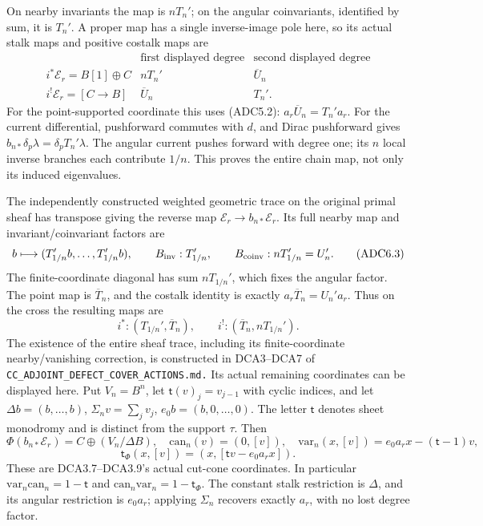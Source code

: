 On nearby invariants the map is \(nT_n'\); on the angular coinvariants,
identified by sum, it is \(T_n'\). A proper map has a single
inverse-image pole here, so its actual stalk maps and positive costalk
maps are \[
\begin{array}{c|cc}
&\text{first displayed degree}&\text{second displayed degree}\\ \hline
i^*\mathscr E_r=B[1]\oplus C&nT_n'&\overline U_n\\
i^!\mathscr E_r=[C\to B]&\overline U_n&T_n'.
\end{array}
\tag{ADC6.2}
\] For the point-supported coordinate this uses (ADC5.2):
\(a_r\overline U_n=T_n'a_r\). For the current differential, pushforward
commutes with \(d\), and Dirac pushforward gives
\(b_{n*}\delta_p\lambda=\delta_pT_n'\lambda\). The angular current
pushes forward with degree one; its \(n\) local inverse branches each
contribute \(1/n\). This proves the entire chain map, not only its
induced eigenvalues.

The independently constructed weighted geometric trace on the original
primal sheaf has transpose giving the reverse map
\(\mathscr E_r\to b_{n*}\mathscr E_r\). Its full nearby map and
invariant/coinvariant factors are \[
b\longmapsto(T_{1/n}'b,\ldots,T_{1/n}'b),\qquad
B_{\rm inv}:T_{1/n}',\qquad B_{\rm coinv}:nT_{1/n}'=U_n'.
\tag{ADC6.3}
\] The finite-coordinate diagonal has sum \(nT_{1/n}'\), which fixes the
angular factor. The point map is \(\overline T_n\), and the costalk
identity is exactly \(a_r\overline T_n=U_n'a_r\). Thus on the cross the
resulting maps are \[
i^*: (T_{1/n}',\overline T_n),\qquad
i^!: (\overline T_n,nT_{1/n}').
\tag{ADC6.4}
\] The existence of the entire sheaf trace, including its
finite-coordinate nearby/vanishing correction, is constructed in
DCA3--DCA7 of \nolinkurl{CC_ADJOINT_DEFECT_COVER_ACTIONS.md.} Its actual
remaining coordinates can be displayed here. Put \(V_n=B^n\), let
\(\mathsf t(v)_j=v_{j-1}\) with cyclic indices, and let
\(\Delta b=(b,\ldots,b)\), \(\Sigma_n v=\sum_jv_j\),
\(e_0b=(b,0,\ldots,0)\). The letter \(\mathsf t\) denotes sheet
monodromy and is distinct from the support \(\tau\). Then \[
\Phi(b_{n*}\mathscr E_r)=C\oplus(V_n/\Delta B),\quad
\mathrm{can}_n(v)=(0,[v]),\quad
\mathrm{var}_n(x,[v])=e_0a_rx-(\mathsf t-1)v,
\] \[
\mathsf t_\Phi(x,[v])=(x,[\mathsf t v-e_0a_rx]).
\tag{ADC6.6}
\] These are DCA3.7--DCA3.9's actual cut-cone coordinates. In particular
\(\mathrm{var}_n\mathrm{can}_n=1-\mathsf t\) and
\(\mathrm{can}_n\mathrm{var}_n=1-\mathsf t_\Phi\). The constant stalk
restriction is \(\Delta\), and its angular restriction is \(e_0a_r\);
applying \(\Sigma_n\) recovers exactly \(a_r\), with no lost degree
factor.

